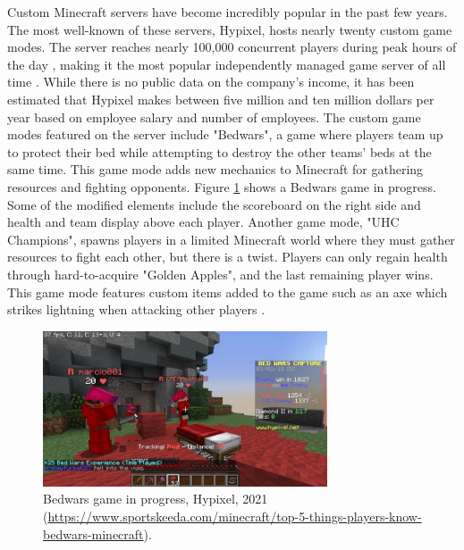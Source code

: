 \documentclass[12pt]{article}
\begin{document}
\begin{onehalfspacing}
Custom Minecraft servers have become incredibly popular in the past few
years. The most well-known of these servers, Hypixel, hosts nearly
twenty custom game modes. The server reaches nearly 100,000 concurrent
players during peak hours of the day \parencite{minecraftservers}, making
it the most popular independently managed game server of all time
\parencite{guinnessindependentserver}. While there is no public data on the
company's income, it has been estimated that Hypixel makes between five
million and ten million dollars per year based on employee salary and
number of employees. The custom game modes featured on the server
include "Bedwars", a game where players team up to protect their bed
while attempting to destroy the other teams' beds at the same time. This
game mode adds new mechanics to Minecraft for gathering resources and
fighting opponents. Figure \ref{fig:2_4_1_1} shows a Bedwars game in progress.
Some of the modified elements include the scoreboard on the right side
and health and team display above each player. Another game mode, "UHC
Champions", spawns players in a limited Minecraft world where they must
gather resources to fight each other, but there is a twist. Players can
only regain health through hard-to-acquire "Golden Apples", and the last
remaining player wins. This game mode features custom items added to the
game such as an axe which strikes lightning when attacking other players
\parencite{hypixelgames}.

\begin{figure}[h] 
    \centering
    \includegraphics[width=0.75\textwidth]{media/media/image5.png} 
    \caption{Bedwars game in progress, Hypixel, 2021 \\ (\url{https://www.sportskeeda.com/minecraft/top-5-things-players-know-bedwars-minecraft}).
} 
    \label{fig:2_4_1_1} 
\end{figure}



\end{onehalfspacing}
\end{document}
